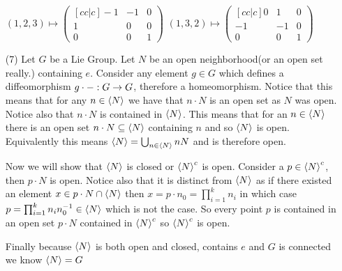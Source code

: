 \documentclass[12pt]{amsart}
\begin{document}
\begin{itemize}
            $(1,2,3)\mapsto\begin{pmatrix}[cc|c]
                -1 & -1 & 0 \\
                1 & 0 & 0 \\
                \hline
                0 & 0 & 1
            \end{pmatrix}$ $(1,3,2)\mapsto\begin{pmatrix}[cc|c]
                0 & 1 & 0 \\
                -1 & -1 & 0 \\
                \hline
                0 & 0 & 1
            \end{pmatrix}$

\item[(7)]
Let $G$ be a Lie Group. Let $N$ be an open neighborhood(or an open set really.) containing $e$. 
Consider any element $g\in G$ which defines a diffeomorphism $g\cdot - :G\rightarrow G$, therefore a homeomorphism. Notice
that this means that for any $n\in\left\langle N \right\rangle$ we have that $n\cdot N$ is an open set as $N$ was open. 
Notice also that $n\cdot N$ is contained in $\left\langle N \right\rangle$.
This means that for an $n\in \left\langle N \right\rangle$ there is an open set $n\cdot N\subseteq \left\langle N \right\rangle$ containing $n$ and so 
$\left\langle N \right\rangle$ is open. Equivalently this means $\left\langle N \right\rangle = \bigcup_{n\in\left\langle N \right\rangle} nN$ and is therefore open.

Now we will show that $\left\langle N \right\rangle$ is closed or $\left\langle N \right\rangle^c$ is open. Consider a $p\in\left\langle N \right\rangle^c$, then $p\cdot N$ is open.
Notice also that it is distinct from $\left\langle N \right\rangle$ as if there existed an element $x\in p\cdot N\cap \left\langle N \right\rangle$ then $
x=p\cdot n_0=\prod^k_{i=1}n_i$ in which case $p=\prod^k_{i=1}n_i n_0^{-1}\in\left\langle N \right\rangle$ which is not the case. 
So every point $p$ is contained in an open set $p\cdot N$ contained in $\left\langle N \right\rangle^c$ so $\left\langle N \right\rangle ^c$ is open.

Finally because $\left\langle N \right\rangle$ is both open and closed, contains $e$ and $G$ is connected we know $\left\langle N \right\rangle= G$ 


\end{itemize}
\end{document}
